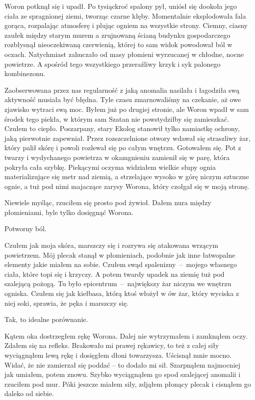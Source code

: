 \documentclass[../MAIN.tex]{subfiles}
\begin{document}
Woron potknął się i upadł. Po tysiąckroć spalony pył, uniósł się dookoła jego ciała ze spragnionej ziemi, tworząc czarne kłęby. Momentalnie eksplodowała fala gorąca, rozpalając atmosferę i plując ogniem na wszystkie strony. Ciemny, ciasny zaułek między starym murem a zrujnowaną ścianą budynku gospodarczego rozbłysnął nieoczekiwaną czerwienią, której to sam widok powodował ból w oczach. Natychmiast zahuczało od masy płomieni wyrzucanej w chłodne, nocne powietrze. A spośród tego wszystkiego przeraźliwy krzyk i syk palonego kombinezonu.

Zaobserwowana przez nas regularność z jaką anomalia nasilała i łagodziła swą aktywność musiała być błędna. Tyle czasu zmarnowaliśmy na czekanie, aż owe zjawisko wytraci swą moc. Byłem już po drugiej stronie, ale Woron wpadł w sam środek tego piekła, w którym sam Szatan nie powstydziłby się zamieszkać. Czułem to ciepło. Poszarpany, stary Ekolog stanowił tylko namiastkę ochrony, jaką pierwotnie zapewniał. Przez rozszczelnione otwory wdawał się straszliwy żar, który palił skórę i powoli rozlewał się po całym wnętrzu. Gotowałem się. Pot z twarzy i wydychanego powietrza w okamgnieniu zamienił się w parę, która pokryła cała szybkę. Piekącymi oczyma widziałem wielkie słupy ognia materializujące się metr nad ziemią, a strzelające wysoko w górę niczym sztuczne ognie, a tuż pod nimi majaczące zarysy Worona, który czołgał się w moją stronę.

Niewiele myśląc, rzuciłem się prosto pod żywioł. Dałem nura między płomieniami, byle tylko dosięgnąć Worona.

Potworny ból.

Czułem jak moja skóra, marszczy się i rozrywa się atakowana wrzącym powietrzem. Mój plecak stanął w płomieniach, podobnie jak inne łatwopalne elementy jakie miałem na sobie. Czułem swąd spalenizny~--~mojego własnego ciała, które topi się i krzyczy. A potem twardy upadek na ziemię tuż pod szalejącą pożogą. Tu było epicentrum~--~największy żar niczym we wnętrzu ogniska. Czułem się jak kiełbasa, którą ktoś włożył w ów żar, który wyciska z niej soki, sprawia, że pęka i marszczy się.

Tak, to idealne porównanie.

Kątem oka dostrzegłem rękę Worona. Dalej nie wytrzymałem i zamknąłem oczy. Zdałem się na refleks. Brakowało mi prawej rękawicy, to też z całej siły wyciągnąłem lewą rękę i dosięgłem dłoni towarzysza. Uścisnął mnie mocno. Widać, że nie zamierzał się poddać – to dodało mi sił. Szarpnąłem najmocniej jak umiałem, potem znowu. Szybko wyciągnąłem go spod szalejącej anomalii i rzuciłem pod mur. Póki jeszcze miałem siły, zdjąłem płonący plecak i cisnąłem go daleko od siebie.
\end{document}
